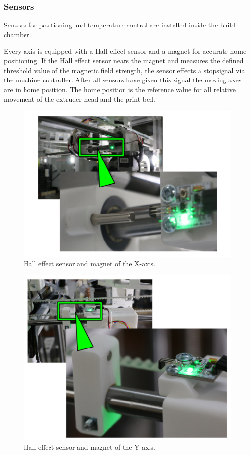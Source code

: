 \subsubsection{Sensors}

Sensors for positioning and temperature control are installed inside the build chamber.

Every axis is equipped with a Hall effect sensor and a magnet for accurate home positioning. If the Hall effect sensor nears the magnet and measures the defined threshold value of the magnetic field strength, the sensor effects a \dq stop\dq signal via the machine controller. After all sensors have given this signal the moving axes are in home position. The home position is the reference value for all relative movement of the extruder head and the print bed.

\begin{figure}[H]
  \centering
  \includegraphics[width=.7\linewidth]{./img/desc_x-sensor.png}
  \caption{Hall effect sensor and magnet of the X-axis.}
\end{figure}

\begin{figure}[H]
  \centering
  \includegraphics[width=.7\linewidth]{./img/desc_y-sensor.png}
  \caption{Hall effect sensor and magnet of the Y-axis.}
\end{figure}

